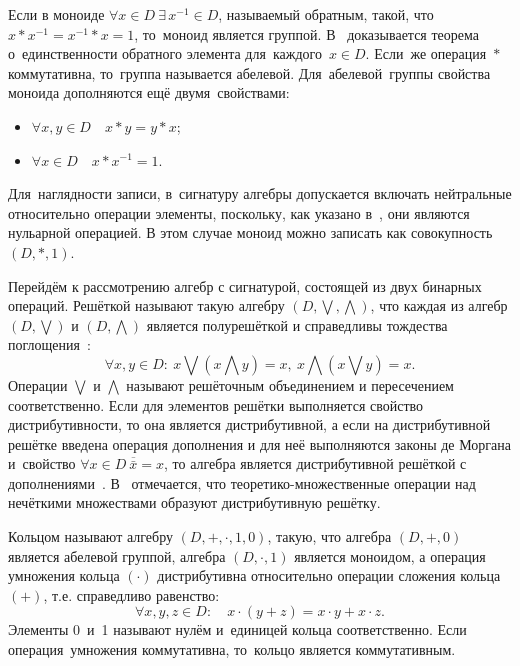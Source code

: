 Если в моноиде $\forall x\in D\ \exists \,x^{-1}\in D$, называемый обратным, такой, что~$x*{{x}^{-1}}={{x}^{-1}}*x=1$, то~моноид является группой. В~\cite{Bauman_DM, Adelson_Velskiy, Voevodin} доказывается теорема о~единственности обратного элемента для~каждого~$x\in D$. Если~же операция~$*$ коммутативна, то~группа называется абелевой. Для~абелевой~группы свойства моноида дополняются ещё двумя~свойствами:
\begin{itemize}
	\item $\forall x,y\in D\quad x*y=y*x$;
	\item $\forall x\in D\quad x*{{x}^{-1}}=1$.
\end{itemize}

Для~наглядности записи, в~сигнатуру алгебры допускается включать нейтральные относительно операции элементы, поскольку, как указано в~\cite{Bauman_DM}, они являются нульарной операцией. В этом случае моноид можно записать как совокупность $\left( D,*,1 \right)$.

Перейдём к рассмотрению алгебр с сигнатурой, состоящей из двух бинарных операций. Решёткой называют такую алгебру $\left( D, \bigvee, \bigwedge \right)$, что каждая из алгебр $\left( D, \bigvee\right)$ и $\left( D, \bigwedge \right)$ является полурешёткой и справедливы тождества поглощения~\cite{Hybrid_Systems}:
\begin{equation*}
  \forall x,y\in D:\ x \bigvee \left( x \bigwedge y \right) = x,\ x \bigwedge \left(x \bigvee y \right) = x.
\end{equation*}
Операции $\bigvee$ и $\bigwedge$ называют решёточным объединением и пересечением соответственно. Если для элементов решётки выполняется свойство дистрибутивности, то она является дистрибутивной, а если на дистрибутивной решётке введена операция дополнения и для неё выполняются законы де Моргана и~свойство $\forall x\in D\ \overline{\bar x}=x$, то алгебра является дистрибутивной решёткой с дополнениями~\cite{Lipetsk}. В~\cite{Kaufmann, Pospelov} отмечается, что теоретико-множественные операции над нечёткими множествами образуют дистрибутивную решётку.

Кольцом называют алгебру $\left( D,+,\cdot ,1,0 \right)$, такую, что алгебра $\left( D,+,0 \right)$ является абелевой группой, алгебра $\left( D,\cdot ,1 \right)$ является моноидом, а операция умножения кольца $\left( \cdot  \right)$ дистрибутивна относительно операции сложения кольца $\left( + \right)$, т.е. справедливо равенство:
\begin{equation*}
	\forall x,y,z\in D:\quad x\cdot \left( y+z \right)=x\cdot y+x\cdot z.
\end{equation*}
Элементы 0~и~1 называют нулём и~единицей кольца соответственно. Если операция~умножения коммутативна, то~кольцо является коммутативным.

